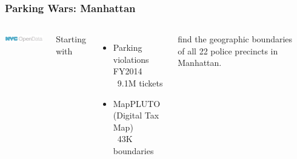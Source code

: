 \documentclass[12pt]{beamer}
\begin{document}
\begin{frame}[t]
\frametitle{Parking Wars: Manhattan}

\vspace{4mm}

\begin{columns}

\includegraphics[width=1.5in]{imgs/nyc.png}

Starting with
\begin{itemize}
\item Parking violations FY2014 \\ ~9.1M tickets 
\item MapPLUTO (Digital Tax Map) \\ ~43K boundaries
\end{itemize}

find the geographic boundaries of all 22 police precincts in Manhattan.

~\\



\end{columns}
\end{frame}
\end{document}
